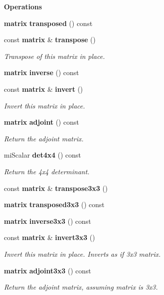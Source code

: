 \begin{Indent}{\bf Operations}\par
\begin{CompactItemize}
\item 
{\bf matrix} {\bf transposed} () const 
\item 
const {\bf matrix} \& {\bf transpose} ()
\begin{CompactList}\small\item\em Transpose of this matrix in place. \item\end{CompactList}\item 
{\bf matrix} {\bf inverse} () const 
\item 
const {\bf matrix} \& {\bf invert} ()
\begin{CompactList}\small\item\em Invert this matrix in place. \item\end{CompactList}\item 
{\bf matrix} {\bf adjoint} () const 
\begin{CompactList}\small\item\em Return the adjoint matrix. \item\end{CompactList}\item 
mi\-Scalar {\bf det4x4} () const 
\begin{CompactList}\small\item\em Return the 4x4 determinant. \item\end{CompactList}\item 
const {\bf matrix} \& {\bf transpose3x3} ()
\item 
{\bf matrix} {\bf transposed3x3} () const 
\item 
{\bf matrix} {\bf inverse3x3} () const 
\item 
const {\bf matrix} \& {\bf invert3x3} ()
\begin{CompactList}\small\item\em Invert this matrix in place. Inverts as if 3x3 matrix. \item\end{CompactList}\item 
{\bf matrix} {\bf adjoint3x3} () const 
\begin{CompactList}\small\item\em Return the adjoint matrix, assuming matrix is 3x3. \item\end{CompactList}\item 

\end{CompactItemize}
\end{Indent}

